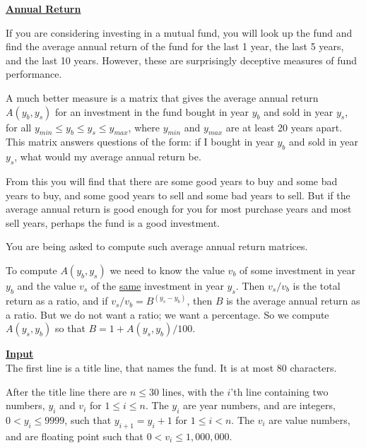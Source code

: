 \documentclass[12pt]{article}
\begin{document}
\newcommand{\problem}[1]{\underline{\Large \bf #1}}
\renewcommand{\section}[1]{\bigskip\underline{\bf #1}\\}
\newcommand{\header}[1]{\underline{\bf #1}}
\setlength{\parindent}{0.0in}
\setlength{\parskip}{1ex}

\problem{Annual Return}

If you are considering investing in a mutual fund, you
will look up the fund and find the average annual return
of the fund for the last 1 year, the last 5 years, and
the last 10 years.  However, these are surprisingly
deceptive measures of fund performance.

A much better measure is a matrix that gives the average
annual return $A(y_b,y_s)$ for an investment in the
fund bought in year $y_b$ and sold in year $y_s$, for
all $y_{min}\le y_b\le y_s\le y_{max}$, where
$y_{min}$ and $y_{max}$ are at least 20 years apart.
This matrix answers questions of the form: if I bought
in year $y_b$ and sold in year $y_s$, what would my
average annual return be.

From this you will find that there are some good years
to buy and some bad years to buy, and some good years
to sell and some bad years to sell.  But if the
average annual return is good enough for you for most
purchase years and most sell years, perhaps the fund
is a good investment.

You are being asked to compute such average annual
return matrices.

To compute $A(y_b,y_s)$ we need to know the value $v_b$
of some investment in year $y_b$ and the value $v_s$ of the
\underline{same} investment in year $y_s$.  Then $v_s/v_b$ is the
total return as a ratio, and if $v_s/v_b=B^{(y_s-y_b)}$, then
$B$ is the average annual return as a ratio.  But we
do not want a ratio; we want a percentage.  So we compute
$A(y_s,y_b)$ so that $B=1+A(y_s,y_b)/100$.

\section{Input}
The first line is a title line, that names the fund.
It is at most 80 characters.

After the title line there are $n\le 30$ lines, with the $i$'th
line containing two numbers, $y_i$ and $v_i$ for
$1\le i\le n$.  The $y_i$ are year numbers, and
are integers, $0<y_i\le 9999$, such that $y_{i+1}=y_i+1$ for
$1\le i<n$.  The $v_i$ are value numbers, and
are floating point such that $0<v_i\le 1,000,000$.
\end{document}
